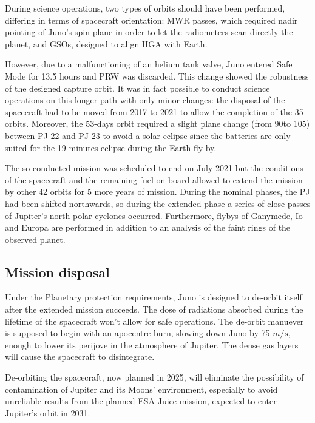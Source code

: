 During science operations, two types of orbits should have been performed, differing in terms of spacecraft orientation: MWR passes, which required nadir pointing of Juno's spin plane in order to let the radiometers scan directly the planet, and GSOs, designed to align HGA with Earth. 

However, due to a malfunctioning of an helium tank valve, Juno entered Safe Mode for 13.5 hours and PRW was discarded. This change showed the robustness of the designed capture orbit. It was in fact possible to conduct science operations on this longer path with only minor changes: the disposal of the spacecraft had to be moved from 2017 to 2021 to allow the completion of the 35 orbits. Moreover, the 53-days orbit required a slight plane change (from 90\textdegree to 105\textdegree) between PJ-22 and PJ-23 to avoid a solar eclipse since the batteries are only suited for the 19 minutes eclipse during the Earth fly-by. 

The so conducted mission was scheduled to end on July 2021 but the conditions of the spacecraft and the remaining fuel on board allowed to extend the mission by other 42 orbits for 5 more years of mission. During the nominal phases, the PJ had been shifted northwards, so during the extended phase a series of close passes of Jupiter's north polar cyclones occurred. Furthermore, flybys of Ganymede, Io and Europa are performed in addition to an analysis of the faint rings of the observed planet. 

\subsection{Mission disposal}
\label{sec: disposal}

Under the Planetary protection requirements, Juno is designed to de-orbit itself after the extended mission succeeds. The dose of radiations absorbed during the lifetime of the spacecraft won't allow for safe operations. The de-orbit manuever is supposed to begin with an apocentre burn, slowing down Juno by 75 $m/s$, enough to lower its perijove in the atmosphere of Jupiter. The dense gas layers will cause the spacecraft to disintegrate.

De-orbiting the spacecraft, now planned in 2025, will eliminate the possibility of contamination of Jupiter and its Moons' environment, especially to avoid unreliable results from the planned ESA Juice mission, expected to enter Jupiter's orbit in 2031.  

